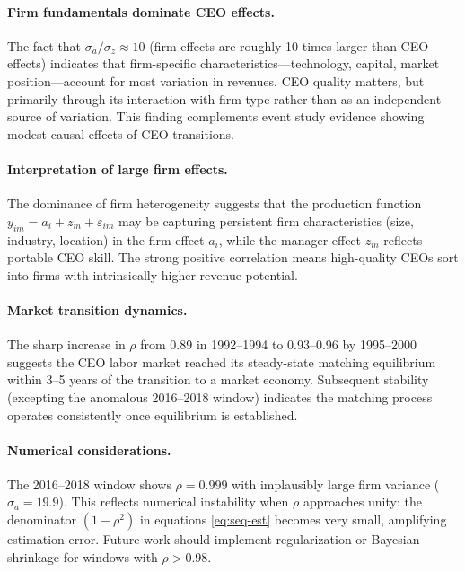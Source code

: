 \documentclass[11pt]{article}
\begin{document}
\paragraph{Firm fundamentals dominate CEO effects.} The fact that $\sigma_a/\sigma_z \approx 10$ (firm effects are roughly 10 times larger than CEO effects) indicates that firm-specific characteristics---technology, capital, market position---account for most variation in revenues. CEO quality matters, but primarily through its interaction with firm type rather than as an independent source of variation. This finding complements event study evidence showing modest causal effects of CEO transitions.

\paragraph{Interpretation of large firm effects.} The dominance of firm heterogeneity suggests that the production function $y_{im} = a_i + z_m + \varepsilon_{im}$ may be capturing persistent firm characteristics (size, industry, location) in the firm effect $a_i$, while the manager effect $z_m$ reflects portable CEO skill. The strong positive correlation means high-quality CEOs sort into firms with intrinsically higher revenue potential.

\paragraph{Market transition dynamics.} The sharp increase in $\rho$ from 0.89 in 1992--1994 to 0.93--0.96 by 1995--2000 suggests the CEO labor market reached its steady-state matching equilibrium within 3--5 years of the transition to a market economy. Subsequent stability (excepting the anomalous 2016--2018 window) indicates the matching process operates consistently once equilibrium is established.

\paragraph{Numerical considerations.} The 2016--2018 window shows $\rho = 0.999$ with implausibly large firm variance ($\sigma_a = 19.9$). This reflects numerical instability when $\rho$ approaches unity: the denominator $(1-\rho^2)$ in equations \eqref{eq:seq-est} becomes very small, amplifying estimation error. Future work should implement regularization or Bayesian shrinkage for windows with $\rho > 0.98$.
\end{document}

